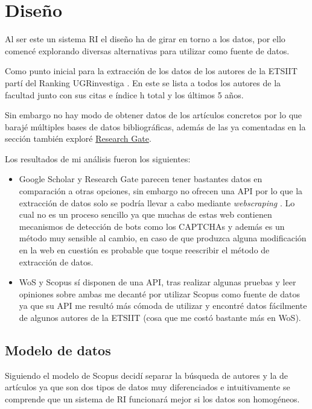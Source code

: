 \chapter{Diseño}

Al ser este un sistema \acrshort{RI} el diseño ha de girar en torno a los datos, por ello comencé explorando diversas alternativas para utilizar como fuente de datos. 

Como punto inicial para la extracción de los datos de los autores de la \acrshort{ETSIIT} partí del Ranking UGRinvestiga \cite{Ranking_UGRInvestiga}. En este se lista a todos los autores de la facultad junto con sus citas e índice h total y los últimos 5 años.

Sin embargo no hay modo de obtener datos de los artículos concretos por lo que barajé múltiples bases de datos bibliográficas, además de las ya comentadas en la sección  también exploré \href{https://www.researchgate.net/}{Research Gate}.

Los resultados de mi análisis fueron los siguientes: 
\begin{itemize}
	
	\item Google Scholar y Research Gate parecen tener bastantes datos en comparación a otras opciones, sin embargo no ofrecen una \acrshort{API} por lo que la extracción de datos solo se podría llevar a cabo mediante \textit{\gls{webscraping}} . Lo cual no es un proceso sencillo ya que muchas de estas web contienen mecanismos de detección de bots como los CAPTCHAs \cite{scrapping_GS} y además es un método muy sensible al cambio, en caso de que produzca alguna modificación en la web en cuestión es probable que toque reescribir el método de extracción de datos.
	\item \acrshort{WoS} y Scopus sí disponen de una \acrshort{API}, tras realizar algunas pruebas y leer opiniones sobre ambas me decanté por utilizar Scopus como fuente de datos ya que su \acrshort{API} me resultó más cómoda de utilizar y encontré datos fácilmente de algunos autores de la \acrshort{ETSIIT} (cosa que me costó bastante más en \acrshort{WoS}).
\end{itemize}

\section{Modelo de datos}

Siguiendo el modelo de Scopus decidí separar la búsqueda de autores y la de artículos ya que son dos tipos de datos muy diferenciados e intuitivamente se comprende que un sistema de \acrshort{RI} funcionará mejor si los datos son homogéneos.

